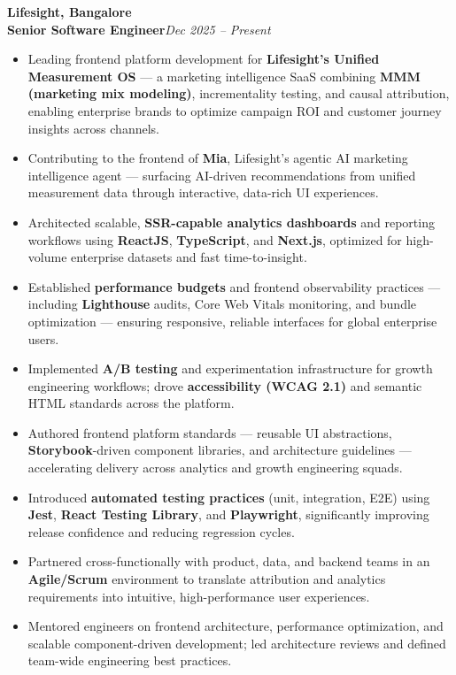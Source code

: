 \documentclass[a4paper,10pt]{article}
\newcommand{\companyfirst}[1]{\noindent\textbf{#1}\\[-2pt]}
\newcommand{\role}[2]{\textbf{#1}\hfill \textit{#2}\\[-3pt]}
\begin{document}
\companyfirst{Lifesight, Bangalore}
\role{Senior Software Engineer}{Dec 2025 -- Present}
\begin{itemize}
  \item Leading frontend platform development for \textbf{Lifesight's Unified Measurement OS} — a marketing intelligence SaaS combining \textbf{MMM (marketing mix modeling)}, incrementality testing, and causal attribution, enabling enterprise brands to optimize campaign ROI and customer journey insights across channels.
  \item Contributing to the frontend of \textbf{Mia}, Lifesight's agentic AI marketing intelligence agent — surfacing AI-driven recommendations from unified measurement data through interactive, data-rich UI experiences.
  \item Architected scalable, \textbf{SSR-capable analytics dashboards} and reporting workflows using \textbf{ReactJS}, \textbf{TypeScript}, and \textbf{Next.js}, optimized for high-volume enterprise datasets and fast time-to-insight.
  \item Established \textbf{performance budgets} and frontend observability practices — including \textbf{Lighthouse} audits, Core Web Vitals monitoring, and bundle optimization — ensuring responsive, reliable interfaces for global enterprise users.
  \item Implemented \textbf{A/B testing} and experimentation infrastructure for growth engineering workflows; drove \textbf{accessibility (WCAG 2.1)} and semantic HTML standards across the platform.
  \item Authored frontend platform standards — reusable UI abstractions, \textbf{Storybook}-driven component libraries, and architecture guidelines — accelerating delivery across analytics and growth engineering squads.
  \item Introduced \textbf{automated testing practices} (unit, integration, E2E) using \textbf{Jest}, \textbf{React Testing Library}, and \textbf{Playwright}, significantly improving release confidence and reducing regression cycles.
  \item Partnered cross-functionally with product, data, and backend teams in an \textbf{Agile/Scrum} environment to translate attribution and analytics requirements into intuitive, high-performance user experiences.
  \item Mentored engineers on frontend architecture, performance optimization, and scalable component-driven development; led architecture reviews and defined team-wide engineering best practices.
\end{itemize}
\end{document}
